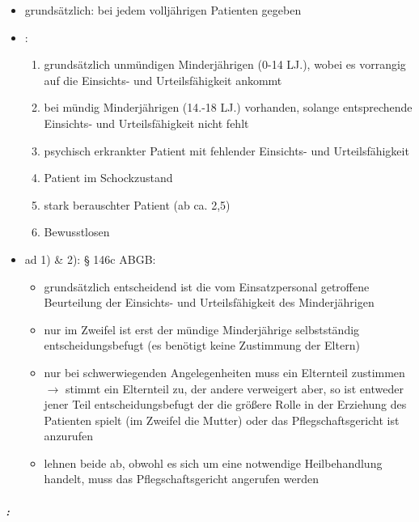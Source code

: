 \begin{itemize}
    \item {\mdseries
    grundsätzlich: bei jedem volljährigen Patienten gegeben }
    
    \item {\mdseries
    : }
    
    
    \begin{enumerate}
        \item grundsätzlich unm\"undigen Minderjährigen (0-14 LJ.), wobei es vorrangig auf die Einsichts- und Urteilsfähigkeit ankommt
        
        \item bei m\"undig Minderjährigen (14.-18 LJ.) vorhanden, solange entsprechende Einsichts- und Urteilsfähigkeit nicht fehlt
        
        \item psychisch erkrankter Patient mit fehlender Einsichts- und Urteilsfähigkeit
        
        \item Patient im Schockzustand 
        
        \item stark berauschter Patient (ab ca. 2,5{\textperthousand})
        
        \item Bewusstlosen
        
    \end{enumerate}
\end{itemize}
\begin{itemize}
    \item[] ad 1) \& 2): {\S} 146c ABGB:
    
    
    \begin{itemize}
        \item grundsätzlich entscheidend ist die vom Einsatzpersonal getroffene
        Beurteilung der Einsichts- und Urteilsfähigkeit des Minderjährigen
        
        \item nur im Zweifel ist erst der m\"undige Minderjährige selbstständig
        entscheidungsbefugt (es ben\"otigt keine Zustimmung der Eltern)
        
        \item nur bei schwerwiegenden Angelegenheiten muss ein Elternteil zustimmen
        ${\rightarrow}$ stimmt ein Elternteil zu, der andere verweigert aber,
        so ist  entweder jener Teil entscheidungsbefugt der die gr\"o{\ss}ere
        Rolle in der Erziehung des Patienten spielt (im Zweifel
        die Mutter) oder das Pflegschaftsgericht ist anzurufen
        
        \item lehnen beide ab, obwohl es sich um eine notwendige Heilbehandlung handelt, muss das
        Pflegschaftsgericht angerufen werden
    \end{itemize}
\end{itemize}
\subparagraph*{:}

